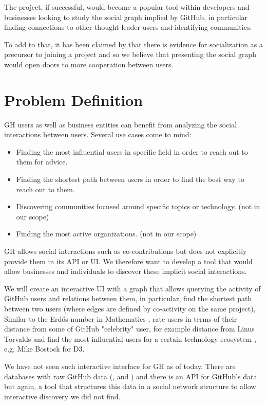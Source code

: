 \documentclass[sigconf,11pt]{acmart}
\begin{document}
The project, if successful, would become a popular tool within developers and businesses
looking to study the social graph implied by GitHub, in particular finding connections to other thought leader users
and identifying communities.

To add to that, it has been claimed by \citeauthor{developer-onboarding-github} \cite{developer-onboarding-github}
that there is evidence for socialization as a precursor to joining a project
and so we believe that presenting the social graph would open doors to more cooperation between users.


\section*{Problem Definition}
GH users as well as business entities can benefit from analyzing the social interactions between users.
Several use cases come to mind:
\begin{itemize}
  \item Finding the most influential users in specific field in order to reach out to them for advice.
  \item Finding the shortest path between users in order to find the best way to reach out to them.
  \item Discovering communities focused around specific topics or technology. (not in our scope)
  \item Finding the most active organizations. (not in our scope)
\end{itemize}

GH allows social interactions such as co-contributions but does not explicitly provide them in its API\cite{gh-api} or UI.
We therefore want to develop a tool that would allow businesses and individuals to discover these implicit social interactions.

We will create an interactive UI with a graph that allows querying the activity of GitHub users
and relations between them, in particular, find the shortest path between two users
(where edges are defined by co-activity on the same project),
Similar to the Erdős number in Mathematics \cite{wiki:erdos}, rate users in terms of their
distance from some of GitHub "celebrity" user, for example distance from Linus Torvalds
and find the most influential users for a certain technology ecosystem , e.g. Mike Bostock for D3.

We have not seen such interactive interface for GH as of today.
There are databases with raw GitHub data (\cite{ghtorrent}, \cite{gharchive} and \cite{bq-gh})
and there is an API for GitHub's data\cite{gh-api} but again, a tool that structures this data
in a social network structure to allow interactive discovery we did not find.
\end{document}

